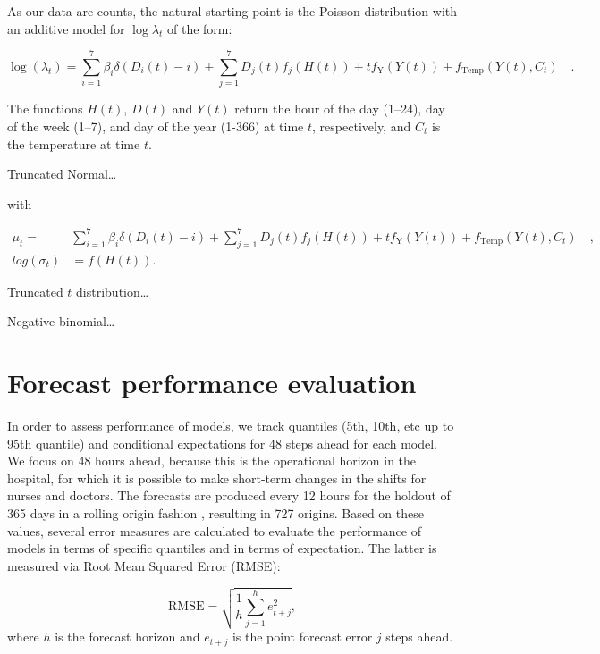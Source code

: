 \documentclass[]{elsarticle} %
\begin{document}
As our data are counts, the natural starting point is the Poisson distribution with an additive model for \(\log \lambda_t\) of the form:

\begin{equation}
  \log(\lambda_t) = \sum_{i=1}^7 \beta_i \delta(D_i(t)-i) + \sum_{j=1}^7 D_j(t) f_j(H(t)) + t f_\text{Y}(Y(t)) + f_\text{Temp}(Y(t),C_t) \quad .
 \label{eq:additivemodel}
\end{equation}

The functions \(H(t)\), \(D(t)\) and \(Y(t)\) return the hour of the day (1--24), day of the week (1--7), and day of the year (1-366) at time \(t\), respectively, and \(C_t\) is the temperature at time \(t\).

Truncated Normal\ldots{}

with

\begin{align*}
  \mu_t = &  \sum_{i=1}^7 \beta_i \delta(D_i(t)-i) + \sum_{j=1}^7 D_j(t) f_j(H(t)) + t f_\text{Y}(Y(t)) + f_\text{Temp}(Y(t),C_t) \quad, \\
  log(\sigma_t) & = f(H(t)) .
\end{align*}

Truncated \(t\) distribution\ldots{}

Negative binomial\ldots{}

\hypertarget{accuracy}{%
\section{Forecast performance evaluation}\label{accuracy}}

In order to assess performance of models, we track quantiles (5th, 10th, etc up to 95th quantile) and conditional expectations for 48 steps ahead for each model. We focus on 48 hours ahead, because this is the operational horizon in the hospital, for which it is possible to make short-term changes in the shifts for nurses and doctors. The forecasts are produced every 12 hours for the holdout of 365 days in a rolling origin fashion \citep{Tashman2000}, resulting in 727 origins. Based on these values, several error measures are calculated to evaluate the performance of models in terms of specific quantiles and in terms of expectation. The latter is measured via Root Mean Squared Error (RMSE):

\begin{equation}
  \mathrm{RMSE} = \sqrt{\frac{1}{h} \sum_{j=1}^h e_{t+j}^2} ,
  \label{eq:RMSE}
\end{equation}
where \(h\) is the forecast horizon and \(e_{t+j}\) is the point forecast error \(j\) steps ahead.
\end{document}
